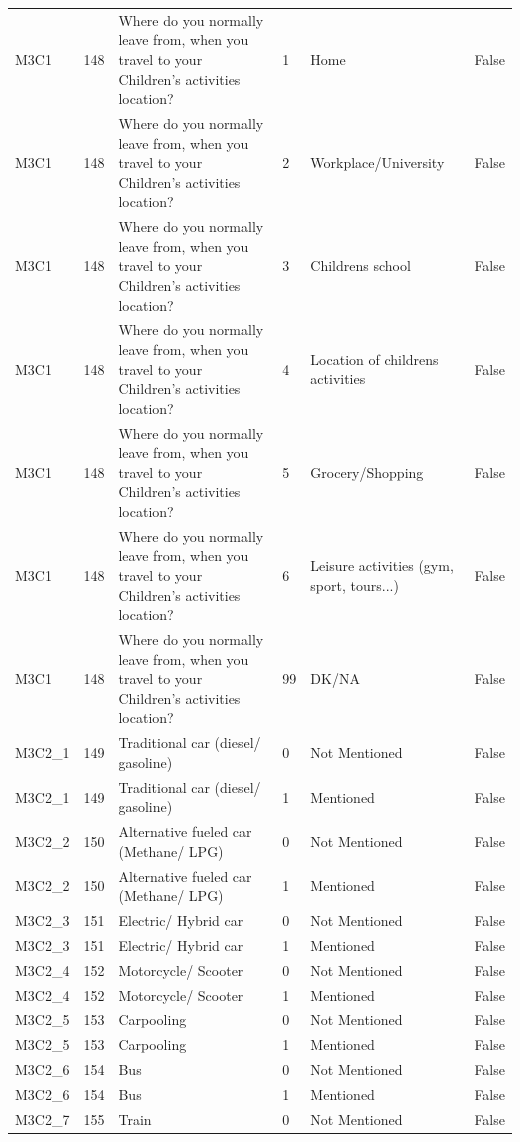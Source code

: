 \begin{tabular}{lrlllr}
M3C1 & 148 & Where do you normally leave from, when you travel to your Children’s activities location? & 1 & Home & False \\
M3C1 & 148 & Where do you normally leave from, when you travel to your Children’s activities location? & 2 & Workplace/University & False \\
M3C1 & 148 & Where do you normally leave from, when you travel to your Children’s activities location? & 3 & Childrens school & False \\
M3C1 & 148 & Where do you normally leave from, when you travel to your Children’s activities location? & 4 & Location of childrens activities & False \\
M3C1 & 148 & Where do you normally leave from, when you travel to your Children’s activities location? & 5 & Grocery/Shopping & False \\
M3C1 & 148 & Where do you normally leave from, when you travel to your Children’s activities location? & 6 & Leisure activities (gym, sport, tours...) & False \\
M3C1 & 148 & Where do you normally leave from, when you travel to your Children’s activities location? & 99 & DK/NA & False \\
M3C2_1 & 149 & Traditional car (diesel/ gasoline) & 0 & Not Mentioned & False \\
M3C2_1 & 149 & Traditional car (diesel/ gasoline) & 1 & Mentioned & False \\
M3C2_2 & 150 & Alternative fueled car (Methane/ LPG) & 0 & Not Mentioned & False \\
M3C2_2 & 150 & Alternative fueled car (Methane/ LPG) & 1 & Mentioned & False \\
M3C2_3 & 151 & Electric/ Hybrid car & 0 & Not Mentioned & False \\
M3C2_3 & 151 & Electric/ Hybrid car & 1 & Mentioned & False \\
M3C2_4 & 152 & Motorcycle/ Scooter & 0 & Not Mentioned & False \\
M3C2_4 & 152 & Motorcycle/ Scooter & 1 & Mentioned & False \\
M3C2_5 & 153 & Carpooling & 0 & Not Mentioned & False \\
M3C2_5 & 153 & Carpooling & 1 & Mentioned & False \\
M3C2_6 & 154 & Bus & 0 & Not Mentioned & False \\
M3C2_6 & 154 & Bus & 1 & Mentioned & False \\
M3C2_7 & 155 & Train & 0 & Not Mentioned & False \\

\end{tabular}
